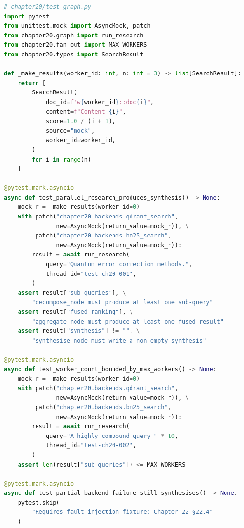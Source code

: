 \begin{lstlisting}[language=Python,
  caption={Integration test with backend mocks and structural assertions},
  label={lst:full-test}]
# chapter20/test_graph.py
import pytest
from unittest.mock import AsyncMock, patch
from chapter20.graph import run_research
from chapter20.fan_out import MAX_WORKERS
from chapter20.types import SearchResult

def _make_results(worker_id: int, n: int = 3) -> list[SearchResult]:
    return [
        SearchResult(
            doc_id=f"w{worker_id}::doc{i}",
            content=f"Content {i}",
            score=1.0 / (i + 1),
            source="mock",
            worker_id=worker_id,
        )
        for i in range(n)
    ]

@pytest.mark.asyncio
async def test_parallel_research_produces_synthesis() -> None:
    mock_r = _make_results(worker_id=0)
    with patch("chapter20.backends.qdrant_search",
               new=AsyncMock(return_value=mock_r)), \
         patch("chapter20.backends.bm25_search",
               new=AsyncMock(return_value=mock_r)):
        result = await run_research(
            query="Quantum error correction methods.",
            thread_id="test-ch20-001",
        )
    assert result["sub_queries"], \
        "decompose_node must produce at least one sub-query"
    assert result["fused_ranking"], \
        "aggregate_node must produce at least one fused result"
    assert result["synthesis"] != "", \
        "synthesise_node must write a non-empty synthesis"

@pytest.mark.asyncio
async def test_worker_count_bounded_by_max_workers() -> None:
    mock_r = _make_results(worker_id=0)
    with patch("chapter20.backends.qdrant_search",
               new=AsyncMock(return_value=mock_r)), \
         patch("chapter20.backends.bm25_search",
               new=AsyncMock(return_value=mock_r)):
        result = await run_research(
            query="A highly compound query " * 10,
            thread_id="test-ch20-002",
        )
    assert len(result["sub_queries"]) <= MAX_WORKERS

@pytest.mark.asyncio
async def test_partial_backend_failure_still_synthesises() -> None:
    pytest.skip(
        "Requires fault-injection fixture: Chapter 22 §22.4"
    )
\end{lstlisting}

